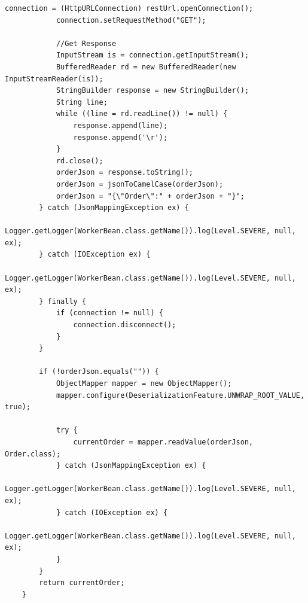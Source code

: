 \begin{appendices}
\begin{lstlisting}[frame=single, caption=Java Code to Receive JSON from REST service, label=lst:receiveOrder]
            connection = (HttpURLConnection) restUrl.openConnection();
            connection.setRequestMethod("GET");

            //Get Response  
            InputStream is = connection.getInputStream();
            BufferedReader rd = new BufferedReader(new InputStreamReader(is));
            StringBuilder response = new StringBuilder();
            String line;
            while ((line = rd.readLine()) != null) {
                response.append(line);
                response.append('\r');
            }
            rd.close();
            orderJson = response.toString();
            orderJson = jsonToCamelCase(orderJson);
            orderJson = "{\"Order\":" + orderJson + "}";
        } catch (JsonMappingException ex) {
            Logger.getLogger(WorkerBean.class.getName()).log(Level.SEVERE, null, ex);
        } catch (IOException ex) {
            Logger.getLogger(WorkerBean.class.getName()).log(Level.SEVERE, null, ex);
        } finally {
            if (connection != null) {
                connection.disconnect();
            }
        }

        if (!orderJson.equals("")) {
            ObjectMapper mapper = new ObjectMapper();
            mapper.configure(DeserializationFeature.UNWRAP_ROOT_VALUE, true);

            try {
                currentOrder = mapper.readValue(orderJson, Order.class);
            } catch (JsonMappingException ex) {
                Logger.getLogger(WorkerBean.class.getName()).log(Level.SEVERE, null, ex);
            } catch (IOException ex) {
                Logger.getLogger(WorkerBean.class.getName()).log(Level.SEVERE, null, ex);
            }
        }
        return currentOrder;
    }
\end{lstlisting}
\end{appendices}
